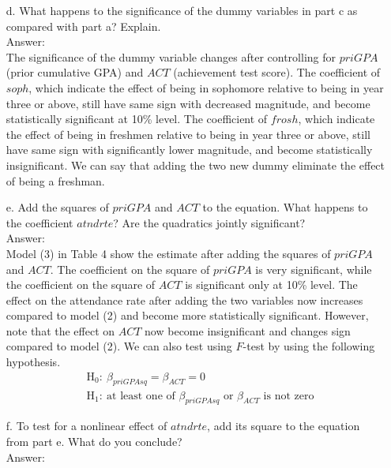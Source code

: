 \documentclass[10pt]{article}
\begin{document}
\begin{enumerate}
\item[d.] What happens to the significance of the dummy variables in part c as compared with part a? Explain.
\\ Answer:\\
The significance of the dummy variable changes after controlling for $priGPA$ (prior cumulative GPA) and $ACT$ (achievement test score). The coefficient of $soph$, which indicate the effect of being in sophomore relative to being in year three or above, still have same sign with decreased magnitude, and become statistically significant at 10\% level. The coefficient of $frosh$, which indicate the effect of being in freshmen relative to being in year three or above, still have same sign with significantly lower magnitude, and become statistically insignificant. We can say that adding the two new dummy eliminate the effect of being a freshman.

\item[e.] Add the squares of $priGPA$ and $ACT$ to the equation. What happens to the coefficient $atndrte$? Are the quadratics jointly significant?
\\ Answer:\\
Model (3) in Table 4 show the estimate after adding the squares of $priGPA$ and $ACT$. The coefficient on the square of $priGPA$ is very significant, while the coefficient on the square of $ACT$ is significant only at 10\% level. The effect on the attendance rate after adding the two variables now increases compared to model (2) and become more statistically significant. However, note that the effect on $ACT$ now become insignificant and changes sign compared to model (2). 
We can also test using $F$-test by using the following hypothesis.
\begin{align*}
    &\text{H}_0:\ \beta_{priGPAsq}=\beta_{ACT}=0\\
    &\text{H}_1:\ \text{at least one of }\beta_{priGPAsq}\text{ or }\beta_{ACT} \text{ is not zero}
\end{align*}

\item[f.] To test for a nonlinear effect of $atndrte$, add its square to the equation from part e. What do you conclude? 
\\ Answer:\\
\end{enumerate}
\end{document}
